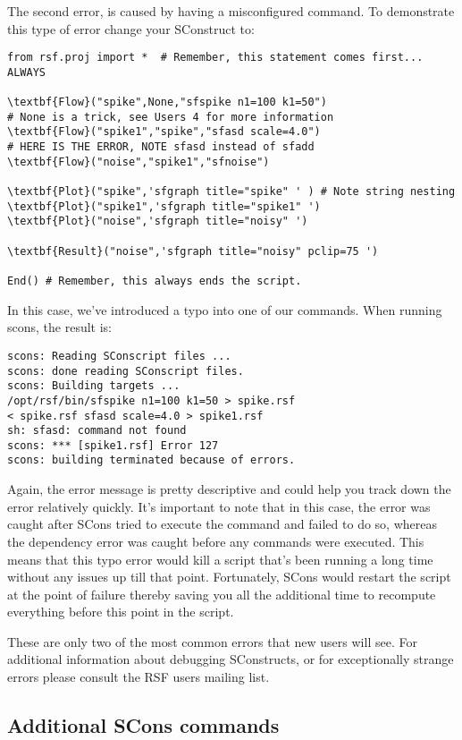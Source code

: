 The second error, is caused by having a misconfigured command.  To demonstrate this type of error change your SConstruct to:

\begin{verbatim}
from rsf.proj import *  # Remember, this statement comes first... ALWAYS

\textbf{Flow}("spike",None,"sfspike n1=100 k1=50") 
# None is a trick, see Users 4 for more information
\textbf{Flow}("spike1","spike","sfasd scale=4.0") 
# HERE IS THE ERROR, NOTE sfasd instead of sfadd
\textbf{Flow}("noise","spike1","sfnoise")

\textbf{Plot}("spike",'sfgraph title="spike" ' ) # Note string nesting
\textbf{Plot}("spike1",'sfgraph title="spike1" ') 
\textbf{Plot}("noise",'sfgraph title="noisy" ')

\textbf{Result}("noise",'sfgraph title="noisy" pclip=75 ')

End() # Remember, this always ends the script.
\end{verbatim}
In this case, we've introduced a typo into one of our commands.  When running scons, the result is:
\begin{verbatim}
scons: Reading SConscript files ...
scons: done reading SConscript files.
scons: Building targets ...
/opt/rsf/bin/sfspike n1=100 k1=50 > spike.rsf
< spike.rsf sfasd scale=4.0 > spike1.rsf
sh: sfasd: command not found
scons: *** [spike1.rsf] Error 127
scons: building terminated because of errors.
\end{verbatim}
Again, the error message is pretty descriptive and could help you track down the error relatively quickly.  It's important to note that in this case, the error was caught after SCons tried to execute the command and failed to do so, whereas the dependency error was caught before any commands were executed.  This means that this typo error would kill a script that's been running a long time without any issues up till that point.  Fortunately, SCons would restart the script at the point of failure thereby saving you all the additional time to recompute everything before this point in the script.

These are only two of the most common errors that new users will see.  For additional information about debugging SConstructs, or for exceptionally strange errors please consult the RSF users mailing list.

\subsection{Additional SCons commands}

